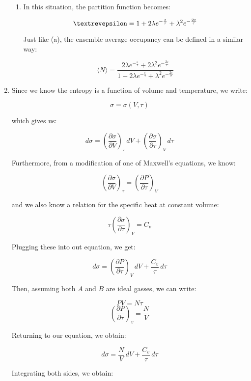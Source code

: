 \begin{enumerate}
\begin{enumerate}
      \item 

        In this situation, the partition function becomes:

        $$\text{\textrevepsilon}=1+2\lambda e^{-\frac{\varepsilon}{\tau}}+\lambda^2 e^{-\frac{2\varepsilon}{\tau}}$$

        Just like (a), the ensemble average occupancy can be defined in a similar way: 

        $$\boxed{\langle N\rangle =\frac{2\lambda e^{-\frac{\varepsilon}{\tau}}+2\lambda^2e^{-\frac{2\varepsilon}{\tau}}}{1+2\lambda e^{-\frac{\varepsilon}{\tau}}+\lambda^2e^{-\frac{2\varepsilon}{\tau}}}}$$

    \end{enumerate}

    \setcounter{enumi}{5}

  \item

    Since we know the entropy is a function of volume and temperature, we write:

    $$\sigma=\sigma(V,\tau)$$

    which gives us:

    $$d\sigma=\left( \frac{\partial \sigma}{\partial V} \right)_\tau\,dV+\left( \frac{\partial \sigma}{\partial \tau} \right)_V\,d\tau$$

    Furthermore, from a modification of one of Maxwell's equations, we know:

    $$\left( \frac{\partial \sigma}{\partial V} \right)_\tau=\left( \frac{\partial P}{\partial \tau} \right)_V$$

    and we also know a relation for the specific heat at constant volume:

    $$\tau\left( \frac{\partial \sigma}{\partial \tau} \right)_V=C_v$$

    Plugging these into out equation, we get:

    $$d\sigma=\left( \frac{\partial P}{\partial\tau} \right)_V\,dV+\frac{C_v}{\tau}\,d\tau$$

    Then, assuming both $A$ and $B$ are ideal gasses, we can write:

    $$PV=N\tau$$
    $$\left( \frac{\partial P}{\partial \tau} \right)_v=\frac{N}{V}$$

    Returning to our equation, we obtain:

    $$d\sigma=\frac{N}{V}\,dV+\frac{C_v}{\tau}\,d\tau$$

    Integrating both sides, we obtain:


\end{enumerate}
